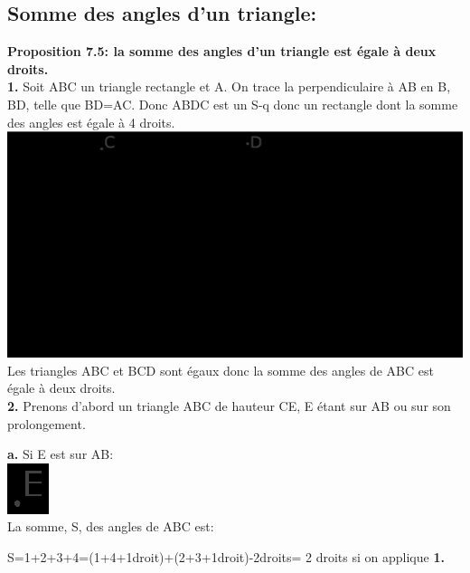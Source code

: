 \documentclass[a4paper, 12pt, twoside]{book}
\begin{document}
   
   
   

\newpage  \subsection{Somme des angles d'un triangle:}
 
 
 
\textbf{Proposition 7.5: la somme des angles d'un triangle est égale à deux droits.}\\
 
 
\textbf{1.} Soit ABC un triangle rectangle et A. On trace la perpendiculaire à AB en B, BD,  telle que BD=AC. Donc ABDC est un S-q donc un rectangle dont la somme des angles est égale à 4 droits.\\


  \includegraphics[scale=0.5]{figures/saccheri1bis.eps}\\
  
 Les triangles ABC et BCD sont égaux donc la somme des angles de ABC est égale à deux droits.\\ 


 \textbf{2.} Prenons d'abord un triangle ABC de hauteur CE, E étant sur AB ou sur son prolongement. \
 
 \textbf{a.} Si E est sur AB:\\
 
 
  \includegraphics[scale=0.5]{figures/saccheri1ter.eps}\\
 
 La somme, S, des angles de ABC est:\
 
  S=1+2+3+4=(1+4+1droit)+(2+3+1droit)-2droits= 2 droits si on applique \textbf{1.}\\
  
\end{document}
